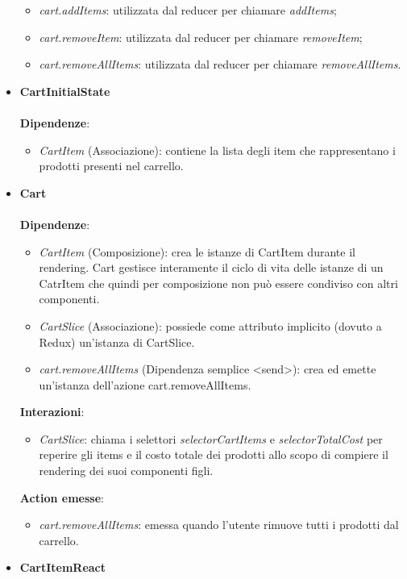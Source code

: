 \begin{itemize}
\begin{itemize}
			\item \textit{cart.addItems}: utilizzata dal reducer per chiamare \textit{addItems};
			\item \textit{cart.removeItem}: utilizzata dal reducer per chiamare \textit{removeItem};
			\item \textit{cart.removeAllItems}: utilizzata dal reducer per chiamare \textit{removeAllItems}.
		\end{itemize}
		\item \textbf{CartInitialState}
		\\\\
		\textbf{Dipendenze}: 
		\begin{itemize}
			\item \textit{CartItem} (Associazione): contiene la lista degli item che rappresentano i prodotti presenti nel carrello.
		\end{itemize} 
		\item \textbf{Cart}
		\\\\
		\textbf{Dipendenze}:
		\begin{itemize}
		\item \textit{CartItem} (Composizione): crea le istanze di CartItem durante il rendering.
		Cart gestisce interamente il ciclo di vita delle istanze di un CatrItem che quindi per composizione
		non può essere condiviso con altri componenti.
		\item \textit{CartSlice} (Associazione): possiede come attributo implicito (dovuto a Redux) un'istanza di CartSlice.
		\item \textit{cart.removeAllItems} (Dipendenza semplice \textless send\textgreater): crea ed emette un'istanza dell'azione cart.removeAllItems.
	\end{itemize} 
	\textbf{Interazioni}:
	\begin{itemize}
		\item \textit{CartSlice}: chiama i selettori \textit{selectorCartItems} e \textit{selectorTotalCost} per reperire gli items e il costo totale dei prodotti 
		allo scopo di compiere il rendering dei suoi componenti figli.
	\end{itemize}
	\textbf{Action emesse}:
	\begin{itemize}
		\item \textit{cart.removeAllItems}: emessa quando l'utente rimuove tutti i prodotti dal carrello.
	\end{itemize}
	\item \textbf{CartItemReact}
	\\\\

\end{itemize}
